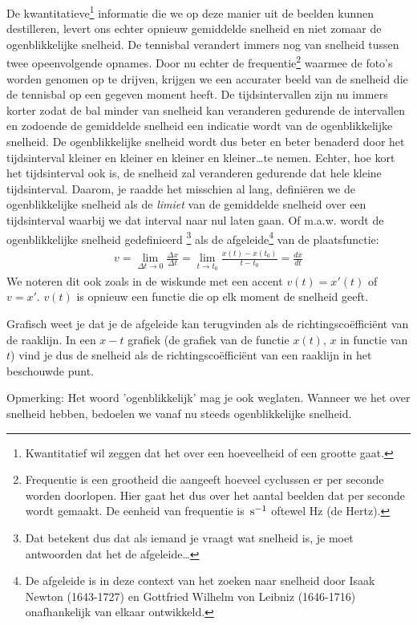 \documentclass{ximera}
\begin{document}
	De kwantitatieve\footnote{Kwantitatief wil zeggen dat het over een hoeveelheid of een grootte gaat.} informatie die we op deze manier uit de beelden kunnen destilleren, levert ons echter opnieuw gemiddelde snelheid en niet zomaar de ogenblikkelijke snelheid. De tennisbal verandert immers nog van snelheid tussen twee opeenvolgende opnames. Door nu echter de frequentie\footnote{Frequentie is een grootheid die aangeeft hoeveel cyclussen er per seconde worden doorlopen. Hier gaat het dus over het aantal beelden dat per seconde wordt gemaakt. De eenheid van frequentie is $\rm\,s^{-1}$ oftewel Hz (de Hertz).} waarmee de foto's worden genomen op te drijven, krijgen we een accurater beeld van de snelheid die de tennisbal op een gegeven moment heeft. De tijdsintervallen zijn nu immers korter zodat de bal minder van snelheid kan veranderen gedurende de intervallen en zodoende de gemiddelde snelheid een indicatie wordt van de ogenblikkelijke snelheid. De ogenblikkelijke snelheid wordt dus beter en beter benaderd door het tijdsinterval kleiner en kleiner en kleiner en kleiner\ldots te nemen. Echter, hoe kort het tijdsinterval ook is, de snelheid zal veranderen gedurende dat hele kleine tijdsinterval. Daarom, je raadde het misschien al lang, defini\"eren we de ogenblikkelijke snelheid als de \emph{limiet} van de gemiddelde snelheid over een tijdsinterval waarbij we dat interval naar nul laten gaan. Of m.a.w. wordt de ogenblikkelijke snelheid gedefinieerd \footnote{Dat betekent dus dat als iemand je vraagt wat snelheid is, je moet antwoorden dat het de afgeleide\ldots} als de afgeleide\footnote{De afgeleide is in deze context van het zoeken naar snelheid door Isaak Newton (1643-1727) en Gottfried Wilhelm von Leibniz (1646-1716) onafhankelijk van elkaar ontwikkeld.} van de plaatsfunctie:
	\begin{eqnarray*}
	v=\lim_{\Delta t\to 0}\frac{\Delta x}{\Delta t}=\lim_{t\to t_0}\frac{x(t)-x(t_0)}{t-t_0}=\frac{dx}{dt}
	\end{eqnarray*}
	We noteren dit ook zoals in de wiskunde met een accent $v(t)=x'(t)$ of $v=x'$. $v(t)$ is opnieuw een functie die op elk moment de snelheid geeft. 
	
	Grafisch weet je dat je de afgeleide kan terugvinden als de richtingsco\"effici\"ent van de raaklijn. In een $x-t$ grafiek (de grafiek van de functie $x(t)$, $x$ in functie van $t$) vind je dus de snelheid als de richtingsco\"effici\"ent van een raaklijn in het beschouwde punt. 
	
	Opmerking: Het woord 'ogenblikkelijk' mag je ook weglaten. Wanneer we het over snelheid hebben, bedoelen we vanaf nu steeds ogenblikkelijke snelheid.
	
\end{document}
